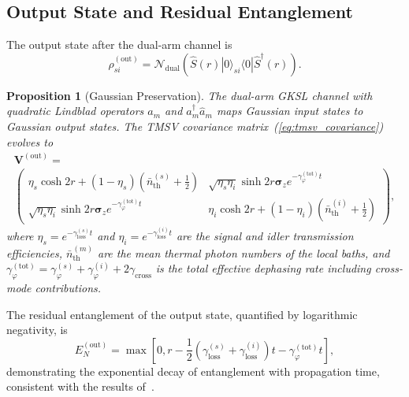 \documentclass[journal]{IEEEtran}
\newtheorem{proposition}{Proposition}
\begin{document}
\subsection{Output State and Residual Entanglement}

The output state after the dual-arm channel is
\begin{equation}\label{eq:output_state}
\rho_{si}^{(\text{out})} = \mathcal{N}_{\text{dual}}\left(\hat{S}(r)|0\rangle_{si}\langle 0|\hat{S}^\dagger(r)\right).
\end{equation}

\begin{proposition}[Gaussian Preservation]\label{prop:gaussian}
The dual-arm GKSL channel with quadratic Lindblad operators $\hat{a}_m$ and $\hat{a}_m^\dagger\hat{a}_m$ maps Gaussian input states to Gaussian output states. The TMSV covariance matrix~(\ref{eq:tmsv_covariance}) evolves to
\begin{equation}\label{eq:output_covariance}
\begin{gathered}
\mathbf{V}^{(\text{out})} =\\ \begin{pmatrix}
\eta_s \cosh 2r + (1-\eta_s)(\bar{n}_{\text{th}}^{(s)} + \tfrac{1}{2}) & \sqrt{\eta_s\eta_i}\sinh 2r \boldsymbol{\sigma}_z e^{-\gamma_{\varphi}^{(\text{tot})}t}  \\
\sqrt{\eta_s\eta_i}\sinh 2r \boldsymbol{\sigma}_z e^{-\gamma_{\varphi}^{(\text{tot})}t}   & \eta_i \cosh 2r + (1-\eta_i)(\bar{n}_{\text{th}}^{(i)} + \tfrac{1}{2})
\end{pmatrix},
\end{gathered}
\end{equation}
where $\eta_s = e^{-\gamma_{\text{loss}}^{(s)}t}$ and $\eta_i = e^{-\gamma_{\text{loss}}^{(i)}t}$ are the signal and idler transmission efficiencies, $\bar{n}_{\text{th}}^{(m)}$ are the mean thermal photon numbers of the local baths, and $\gamma_{\varphi}^{(\text{tot})} = \gamma_{\varphi}^{(s)} + \gamma_{\varphi}^{(i)} + 2\gamma_{\text{cross}}$ is the total effective dephasing rate including cross-mode contributions.
\end{proposition}

The residual entanglement of the output state, quantified by logarithmic negativity, is
\begin{equation}\label{eq:residual_entanglement}
E_N^{(\text{out})} = \max\left[0, r - \frac{1}{2}\left(\gamma_{\text{loss}}^{(s)} + \gamma_{\text{loss}}^{(i)}\right)t - \gamma_{\varphi}^{(\text{tot})}t\right],
\end{equation}
demonstrating the exponential decay of entanglement with propagation time, consistent with the results of~\cite{karsa2024quantum}.
\end{document}
